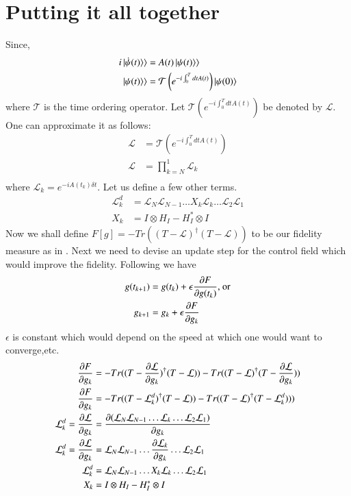 \section{Putting it all together}
Since,
\begin{align}
    i\ket{\dot{\psi}(t)}\rangle &= A(t)\ket{\psi(t)}\rangle\\
    \ket{\psi(t)}\rangle &= \mathcal{T}\left(e^{-i\int_{0}^{T} dt A(t)} \right)\ket{\psi(0)}
\end{align}
where $\mathcal{T}$ is the time ordering operator.
Let $\mathcal{T}\left(e^{-i\int_{0}^{T} dt A(t)} \right)$ be denoted by $\mathcal{L}$. One can approximate it as follows:
\begin{align}
    \mathcal{L}&=\mathcal{T}\left(e^{-i\int_{0}^{T}dt A(t)}\right)\\
    \mathcal{L}&= \prod_{k = N}^{1} \mathcal{L}_{k}\\
\end{align}
where $\mathcal{L}_{k} = e^{-iA(t_{k})\delta t}$.
Let us define a few other terms.
\begin{align}\label{some_def}
    \mathcal{L}^{d}_{k} &= \mathcal{L}_{N}\mathcal{L}_{N-1}\ldots X_{k} \mathcal{L}_{k}\ldots \mathcal{L}_{2}\mathcal{L}_{1}\\
    X_{k} &= I\otimes H_{I} - H_{I}^{*}\otimes I 
\end{align}
Now we shall define $F[g] = - Tr((T - \mathcal{L})^{\dagger}(T - \mathcal{L}))$ to be our fidelity measure as in \cite{khaneja2005optimal}. Next we need to devise an update step for the control field which would improve the fidelity. Following \cite{khaneja2005optimal} we have 
\begin{align}\label{update_step}
    g(t_{k+1})&= g(t_{k}) + \epsilon\pdv{F}{g(t_{k})} \text{, or}\\
    g_{k+1} &=    g_{k}   + \epsilon\pdv{F}{g_{k}}
\end{align}
$\epsilon$ is  constant which would depend on the speed at which one would want to converge,etc.
\begin{align}
    \pdv{F}{g_{k}}&= -Tr((T - \pdv{\mathcal{L}}{g_{k}})^{\dagger}(T - \mathcal{L})) - Tr((T - \mathcal{L})^{\dagger}(T - \pdv{\mathcal{L}}{g_{k}})) \\
    \pdv{F}{g_{k}}&=  -Tr((T - \mathcal{L}^{d}_{k})^{\dagger}(T - \mathcal{L})) - Tr((T - \mathcal{L})^{\dagger}(T - \mathcal{L}^{d}_{k})))\\
    \mathcal{L}^{d}_{k}=\pdv{\mathcal{L}}{g_{k}} &= \pdv{(\mathcal{L}_{N}\mathcal{L}_{N-1}\ldots  \mathcal{L}_{k}\ldots \mathcal{L}_{2}\mathcal{L}_{1})}{g_{k}}\\
    \mathcal{L}^{d}_{k}=\pdv{\mathcal{L}}{g_{k}} &= \mathcal{L}_{N}\mathcal{L}_{N-1}\ldots \pdv{ \mathcal{L}_{k}}{g_{k}}\ldots \mathcal{L}_{2}\mathcal{L}_{1}\\
    \mathcal{L}^{d}_{k} &= \mathcal{L}_{N}\mathcal{L}_{N-1}\ldots X_{k} \mathcal{L}_{k}\ldots \mathcal{L}_{2}\mathcal{L}_{1}\\
    X_{k} &= I\otimes H_{I} - H_{I}^{*}\otimes I 
\end{align}
